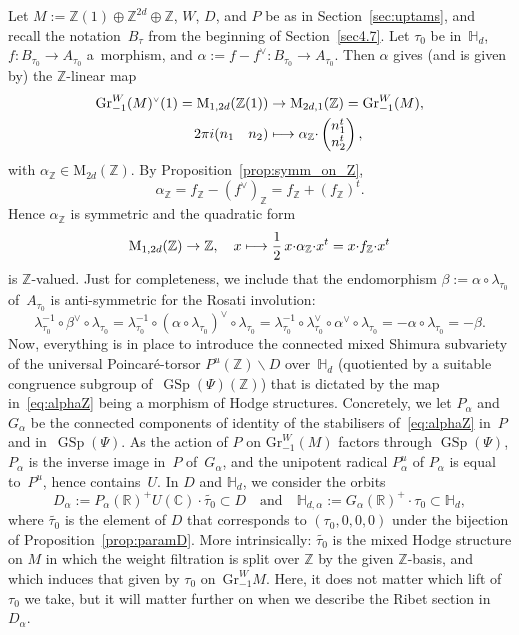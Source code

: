 \documentclass[11pt]{article}
\providecommand{\C}{}
\def\mto{\mathchoice{\longmapsto}{\mapsto}{\mapsto}{\mapsto}}
\let\oldvee\vee
\renewcommand{\vee}{{\scriptscriptstyle\oldvee}}
\theoremstyle{plain}
\theoremstyle{definition}
\numberwithin{equation}{subsection}
\renewcommand{\C}{\mathbb C}
\newcommand{\R}{\mathbb R}
\newcommand{\Z}{\mathbb Z}
\renewcommand{\H}{\mathbb H}
\newcommand{\Gr}{\mathrm{Gr}}
\newcommand{\rmM}{\mathrm{M}}
\DeclareMathOperator{\GSp}{GSp}
\begin{document}
Let $M:=\Z(1)\oplus\Z^{2d}\oplus\Z$, $W$, $D$, and $P$ be as in
Section~\ref{sec:uptams}, and recall the notation~$B_\tau$ from the
beginning of Section~\ref{sec4.7}.
Let $\tau_0$ be in~$\H_d$, $f\colon B_{\tau_0}\to
A_{\tau_0}$ a~morphism, and $\alpha:=f-f^\vee\colon B_{\tau_0}\to
A_{\tau_0}$. Then $\alpha$ gives (and is given by) the $\Z$-linear map
\begin{equation}\label{eq:alphaZ}
\begin{aligned}
\Gr^W_{-1}(M)^\vee(1) = \rmM_{1,2d}(\Z(1)) & \to \rmM_{2d,1}(\Z)
= \Gr^W_{-1} (M),\\
2\pi i (\begin{matrix} n_1 & n_2\end{matrix}) & \mto
\alpha_\Z{\cdot}\begin{pmatrix} n_1^t\\ n_2^t\end{pmatrix},
\end{aligned}
\end{equation}
with $\alpha_\Z \in\rmM_{2d}(\Z)$.
By Proposition~\ref{prop:symm_on_Z},
\[
\alpha_\Z = f_\Z -(f^\vee)_\Z = f_\Z +(f_\Z)^t.
\]
Hence $\alpha_\Z$ is symmetric and the quadratic form
\[
\rmM_{1,2d}(\Z) \to \Z,\quad
x\mto \frac{1}{2}\,x{\cdot}\alpha_\Z{\cdot}x^t = x{\cdot}f_\Z{\cdot}x^t
\]
is $\Z$-valued. Just for completeness, we include that the
endomorphism $\beta:=\alpha\circ \lambda_{\tau_0}$ of~$A_{\tau_0}$ is
anti-symmetric for the Rosati involution:
\[
\lambda_{\tau_0}^{-1}\circ \beta^\vee \circ \lambda_{\tau_0} =
\lambda_{\tau_0}^{-1}\circ (\alpha\circ \lambda_{\tau_0})^\vee \circ
\lambda_{\tau_0} =
\lambda_{\tau_0}^{-1}\circ \lambda_{\tau_0}^\vee\circ\alpha^\vee \circ
\lambda_{\tau_0} = -\alpha \circ \lambda_{\tau_0} =-\beta.
\]
Now, everything is in place to introduce the connected mixed Shimura
subvariety of the universal Poincaré-torsor $P^u(\Z)\backslash D$
over~$\H_d$ (quotiented by a suitable congruence subgroup
of~$\GSp(\Psi)(\Z)$) that is dictated by the map in~\eqref{eq:alphaZ}
being a morphism of Hodge structures. Concretely, we let $P_\alpha$
and $G_\alpha$ be the connected components of identity of the
stabilisers of~\eqref{eq:alphaZ} in~$P$ and in~$\GSp(\Psi)$. As the
action of $P$ on $\Gr^W_{-1}(M)$ factors through $\GSp(\Psi)$,
$P_\alpha$ is the inverse image in~$P$ of~$G_\alpha$, and the
unipotent radical $P_\alpha^u$ of $P_\alpha$ is equal to~$P^u$, hence
contains~$U$. In $D$ and $\H_d$, we consider the orbits
\begin{equation}\label{eq:Dalpha}
D_\alpha:=P_\alpha(\R)^+U(\C){\cdot}\widetilde{\tau_0} \subset D
\quad\text{and}\quad
\H_{d,\alpha}:=G_\alpha(\R)^+{\cdot}\tau_0 \subset \H_d ,
\end{equation}
where $\widetilde{\tau_0}$ is the element of $D$ that corresponds to
$(\tau_0,0,0,0)$ under the bijection of
Proposition~\ref{prop:paramD}. More intrinsically:
$\widetilde{\tau_0}$ is the mixed Hodge structure on $M$ in which the
weight filtration is split over $\Z$ by the given $\Z$-basis, and
which induces that given by $\tau_0$ on~$\Gr^W_{-1}M$. Here, it does
not matter which lift of $\tau_0$ we take, but it will matter further
on when we describe the Ribet section in~$D_\alpha$.
\end{document}
